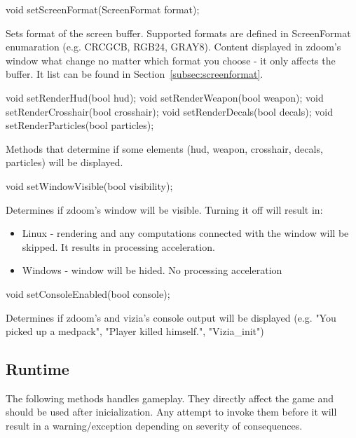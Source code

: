 \vspace{20pt}
\begin{clinee}
 void setScreenFormat(ScreenFormat format);
\end{clinee}

Sets format of the screen buffer. Supported formats are defined in ScreenFormat enumaration (e.g. CRCGCB, RGB24, GRAY8). Content displayed in zdoom's window what change no matter which format you choose - it only affects the buffer. It list can be found in Section~\ref{subsec:screenformat}.


\vspace{20pt}
\begin{clinee}       
void setRenderHud(bool hud);
void setRenderWeapon(bool weapon);
void setRenderCrosshair(bool crosshair);
void setRenderDecals(bool decals);
void setRenderParticles(bool particles);
\end{clinee}

Methods that determine if some elements (hud, weapon, crosshair, decals, particles) will be displayed.


\vspace{20pt}
\begin{clinee}
void setWindowVisible(bool visibility);
\end{clinee}

Determines if zdoom's window will be visible.
Turning it off will result in:
\begin{itemize}
\item Linux - rendering and any computations connected with the window will be skipped. It results in processing acceleration.
\item Windows - window will be hided. No processing acceleration
\end{itemize}


\vspace{20pt}
\begin{clinee}
void setConsoleEnabled(bool console);
\end{clinee}

Determines if zdoom's and vizia's console output will be displayed (e.g. "You picked up a medpack", "Player killed himself.", "Vizia\_init")


\vspace{20pt}
\subsection{Runtime}\label{subsec:runtime_methods}
The following methods handles gameplay. They directly affect the game and should be used after inicialization. 
Any attempt to invoke them before it will result in a warning/exception depending on severity of consequences. 


